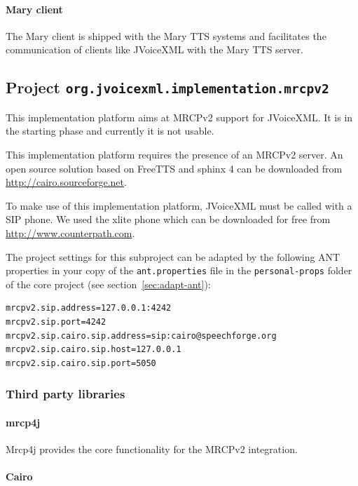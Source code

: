 \documentclass[11pt,a4paper]{article}
\begin{document}
\paragraph{Mary client}

The Mary client is shipped with the Mary TTS systems and facilitates the
communication of clients like JVoiceXML with the Mary TTS server.


\subsection{Project \texttt{org.jvoicexml.implementation.mrcpv2}}

This implementation platform aims at MRCPv2 support for JVoiceXML. It is in the
starting phase and currently it is not usable.

This implementation platform requires the presence of an MRCPv2 server. An open
source solution based on FreeTTS and sphinx 4 can be downloaded from
\url{http://cairo.sourceforge.net}.

To make use of this implementation platform, JVoiceXML must be called with a SIP
phone. We used the xlite phone which can be downloaded for free from
\url{http://www.counterpath.com}.

The project settings for this subproject can be adapted by the following ANT
properties in your copy of the \texttt{ant.properties} file in the
\texttt{personal-props} folder of the core project (see 
section~\ref{sec:adapt-ant}):
\begin{lstlisting}
mrcpv2.sip.address=127.0.0.1:4242
mrcpv2.sip.port=4242
mrcpv2.sip.cairo.sip.address=sip:cairo@speechforge.org
mrcpv2.sip.cairo.sip.host=127.0.0.1
mrcpv2.sip.cairo.sip.port=5050
\end{lstlisting}

\subsubsection{Third party libraries}
\label{sec:mrcpv2-third-party-libr}

\paragraph{mrcp4j}

Mrcp4j provides the core functionality for the MRCPv2 integration.

\paragraph{Cairo}
\end{document}
